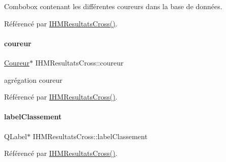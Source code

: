 Combobox contenant les différentes coureurs dans la base de données. 



Référencé par \hyperlink{class_i_h_m_resultats_cross_a94afa0356ebc98e497dfecca3e1bb00b}{I\+H\+M\+Resultats\+Cross()}.

\mbox{\label{class_i_h_m_resultats_cross_ab637383c58d9ce784aec696ccd69d709}} 
\paragraph{\texorpdfstring{coureur}{coureur}}
{\footnotesize\ttfamily \hyperlink{class_coureur}{Coureur}$\ast$ I\+H\+M\+Resultats\+Cross\+::coureur\hspace{0.3cm}{\ttfamily [private]}}



agrégation coureur 



Référencé par \hyperlink{class_i_h_m_resultats_cross_a94afa0356ebc98e497dfecca3e1bb00b}{I\+H\+M\+Resultats\+Cross()}.

\mbox{\label{class_i_h_m_resultats_cross_a455bc28e3605cd327067be2db255c911}} 
\paragraph{\texorpdfstring{label\+Classement}{labelClassement}}
{\footnotesize\ttfamily Q\+Label$\ast$ I\+H\+M\+Resultats\+Cross\+::label\+Classement\hspace{0.3cm}{\ttfamily [private]}}



Référencé par \hyperlink{class_i_h_m_resultats_cross_a94afa0356ebc98e497dfecca3e1bb00b}{I\+H\+M\+Resultats\+Cross()}.

\mbox{\label{class_i_h_m_resultats_cross_a0cec9448e3ac680fd93cff9c4c709e1b}} 
